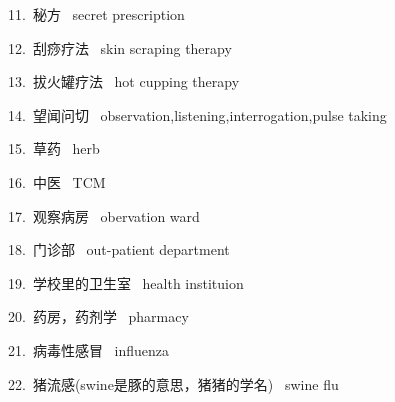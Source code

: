 \documentclass[a4paper, 12pt]{article}
\begin{document}
\begin{multicols}{2}
\begin{flushleft}
11.\ 秘方 \ secret prescription
\end{flushleft}

\begin{flushleft}
12.\ 刮痧疗法 \ skin scraping therapy
\end{flushleft}
\end{multicols}

\begin{multicols}{2}
\begin{flushleft}
13.\ 拔火罐疗法 \ hot cupping therapy
\end{flushleft}

\begin{flushleft}
14.\ 望闻问切 \ observation,listening,interrogation,pulse taking
\end{flushleft}
\end{multicols}

\begin{multicols}{2}
\begin{flushleft}
15.\ 草药 \ herb
\end{flushleft}

\begin{flushleft}
16.\ 中医 \ TCM
\end{flushleft}
\end{multicols}

\begin{multicols}{2}
\begin{flushleft}
17.\ 观察病房 \ obervation ward
\end{flushleft}

\begin{flushleft}
18.\ 门诊部 \ out-patient department
\end{flushleft}
\end{multicols}

\begin{multicols}{2}
\begin{flushleft}
19.\ 学校里的卫生室 \ health instituion
\end{flushleft}

\begin{flushleft}
20.\ 药房，药剂学 \ pharmacy
\end{flushleft}
\end{multicols}

\begin{multicols}{2}
\begin{flushleft}
21.\ 病毒性感冒 \ influenza
\end{flushleft}

\begin{flushleft}
22.\ 猪流感(swine是豚的意思，猪猪的学名) \ swine flu
\end{flushleft}
\end{multicols}
\end{document}
